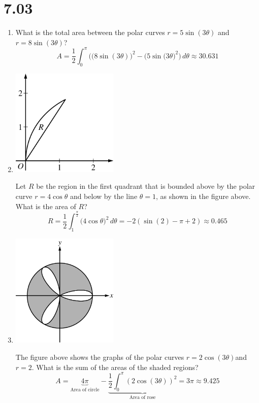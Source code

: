 \documentclass[12pt]{article}
\begin{document}
\section*{7.03}
\begin{enumerate}
	\item What is the total area between the polar curves $r = 5 \sin(3\theta)$ and $r = 8 \sin(3\theta)$?
	$$A = \frac{1}{2} \int_{0}^{\pi} \bigg(\big(8\sin(3\theta))^2 - \big(5\sin(3\theta\big)^2\bigg)\, d\theta \approx \boxed{30.631}$$
	\item 
	      \begin{center}
	      	\includegraphics[width=2in]{7.032.png}
	      \end{center}
	      Let $R$ be the region in the first quadrant that is bounded above by the polar curve $r=4\cos \theta$ and below by the line $\theta=1$, as shown in the figure above. What is the area of $R$?
	$$R = \frac{1}{2}\int_{1}^{\frac{\pi}{2}}\big(4\cos\theta\big)^2\, d\theta =-2(\sin(2)-\pi+2) \approx \boxed{0.465}$$
	\item 
	      \begin{center}
	      	\includegraphics[width = 2in]{7.033.png}
	      \end{center}
	      The figure above shows the graphs of the polar curves $r=2\cos(3\theta)$and $r=2$. What is the sum of the areas of the shaded regions?
	$$A=\underbrace{4\pi}_{\text{Area of circle}} - \underbrace{\frac{1}{2}\int_{0}^{\pi} (2\cos(3\theta))^2}_{\text{Area of rose}} = 3\pi \approx \boxed{9.425}$$

\end{enumerate}
\end{document}
